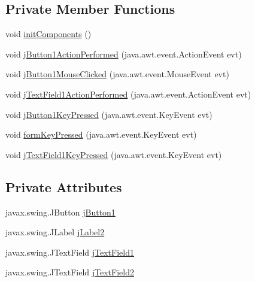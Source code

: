 \subsection*{Private Member Functions}
\begin{DoxyCompactItemize}
\item 
void \hyperlink{classcom_1_1poly_1_1nlp_1_1filekommander_1_1views_1_1_file_kommander_g_u_i_a4a070fcefc763249e6af8ed3c4db654b}{init\-Components} ()
\item 
void \hyperlink{classcom_1_1poly_1_1nlp_1_1filekommander_1_1views_1_1_file_kommander_g_u_i_a01d394178f39508f4fed1735790ba590}{j\-Button1\-Action\-Performed} (java.\-awt.\-event.\-Action\-Event evt)
\item 
void \hyperlink{classcom_1_1poly_1_1nlp_1_1filekommander_1_1views_1_1_file_kommander_g_u_i_aeaa83ab2594c30896c87c01f5678c8a4}{j\-Button1\-Mouse\-Clicked} (java.\-awt.\-event.\-Mouse\-Event evt)
\item 
void \hyperlink{classcom_1_1poly_1_1nlp_1_1filekommander_1_1views_1_1_file_kommander_g_u_i_abb2bc73d0fd9224bc86a1fd76d9b3216}{j\-Text\-Field1\-Action\-Performed} (java.\-awt.\-event.\-Action\-Event evt)
\item 
void \hyperlink{classcom_1_1poly_1_1nlp_1_1filekommander_1_1views_1_1_file_kommander_g_u_i_a5b5a0a04cdb90cc03d34d3966b865994}{j\-Button1\-Key\-Pressed} (java.\-awt.\-event.\-Key\-Event evt)
\item 
void \hyperlink{classcom_1_1poly_1_1nlp_1_1filekommander_1_1views_1_1_file_kommander_g_u_i_ae80581ca8844659251b69cfc615424aa}{form\-Key\-Pressed} (java.\-awt.\-event.\-Key\-Event evt)
\item 
void \hyperlink{classcom_1_1poly_1_1nlp_1_1filekommander_1_1views_1_1_file_kommander_g_u_i_af647628975c199e876166b311c1c6d73}{j\-Text\-Field1\-Key\-Pressed} (java.\-awt.\-event.\-Key\-Event evt)
\end{DoxyCompactItemize}
\subsection*{Private Attributes}
\begin{DoxyCompactItemize}
\item 
javax.\-swing.\-J\-Button \hyperlink{classcom_1_1poly_1_1nlp_1_1filekommander_1_1views_1_1_file_kommander_g_u_i_a7fdc3f53573570f3f345be50e76a0f53}{j\-Button1}
\item 
javax.\-swing.\-J\-Label \hyperlink{classcom_1_1poly_1_1nlp_1_1filekommander_1_1views_1_1_file_kommander_g_u_i_abc00d454e82d9d65d52df7063d61fe99}{j\-Label2}
\item 
javax.\-swing.\-J\-Text\-Field \hyperlink{classcom_1_1poly_1_1nlp_1_1filekommander_1_1views_1_1_file_kommander_g_u_i_a50d44a9170d3b9fe79bd1f26aeaff9df}{j\-Text\-Field1}
\item 
javax.\-swing.\-J\-Text\-Field \hyperlink{classcom_1_1poly_1_1nlp_1_1filekommander_1_1views_1_1_file_kommander_g_u_i_a9366b4d7bb461245e298b21d0dd5e3a4}{j\-Text\-Field2}
\end{DoxyCompactItemize}
